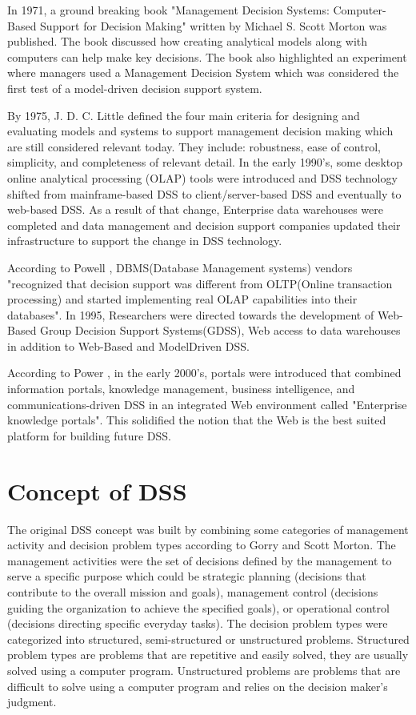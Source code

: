 \indent In 1971, a ground breaking book "Management Decision Systems: Computer-Based Support for Decision Making" written by Michael S. Scott Morton was published. The book discussed how creating analytical models along with computers can help make key decisions. The book also highlighted an experiment where managers used a Management Decision System which was considered the first test of a model-driven decision support system.\cite{power2007brief}

\indent By 1975, J. D. C. Little defined the four main criteria for designing and evaluating models and systems to support management decision making which are still considered relevant today. They include: robustness, ease of control, simplicity, and completeness of relevant detail.\cite{power2007brief} In the early 1990's, some desktop online analytical processing (OLAP) tools were introduced and DSS technology shifted from mainframe-based DSS to client/server-based DSS and eventually to web-based DSS.\cite{bhargava2001decision} As a result of that change, Enterprise data warehouses were completed and data management and decision support companies updated their infrastructure to support the change in DSS technology.

\indent According to Powell \cite{powell2001dm}, DBMS(Database Management systems) vendors "recognized that decision support was different from OLTP(Online transaction processing) and started implementing real OLAP capabilities into their databases". In 1995, Researchers were directed towards the development of Web-Based Group Decision Support Systems(GDSS), Web access to data warehouses in addition to Web-Based and ModelDriven DSS.

According to Power \cite{power2007brief}, in the early 2000's, portals were introduced that combined information portals, knowledge management, business intelligence, and communications-driven DSS in an integrated Web environment called "Enterprise knowledge portals". This solidified the notion that the Web is the best suited platform for building future DSS.
\section{Concept of DSS}
\label{sec:FoundationsConcept}
\indent The original DSS concept was built by combining some categories of management activity and decision problem types according to Gorry and Scott Morton.\cite{gorry1989framework} The management activities were the set of decisions defined by the management to serve a specific purpose which could be strategic planning (decisions that contribute to the overall mission and goals), management control (decisions guiding the organization to achieve the specified goals), or operational control (decisions directing specific everyday tasks). The decision problem types were categorized into structured, semi-structured or unstructured problems. Structured problem types are problems that are repetitive and easily solved, they are usually solved using a computer program. Unstructured problems are problems that are difficult to solve using a computer program and relies on the decision maker's judgment.\cite{shim2002past}

